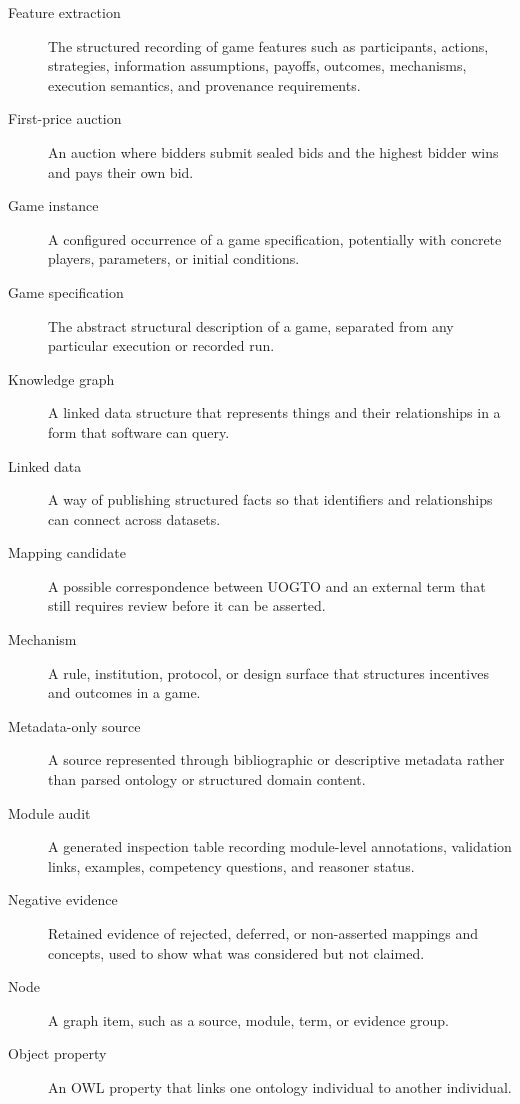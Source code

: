 \documentclass[11pt]{article}
\begin{document}
\begin{description}
\item[\hypertarget{gloss:feature-extraction}{Feature extraction}] The structured recording of game features such as participants, actions, strategies, information assumptions, payoffs, outcomes, mechanisms, execution semantics, and provenance requirements.
\item[\hypertarget{gloss:first-price-auction}{First-price auction}] An auction where bidders submit sealed bids and the highest bidder wins and pays their own bid.
\item[\hypertarget{gloss:game-instance}{Game instance}] A configured occurrence of a game specification, potentially with concrete players, parameters, or initial conditions.
\item[\hypertarget{gloss:game-specification}{Game specification}] The abstract structural description of a game, separated from any particular execution or recorded run.
\item[\hypertarget{gloss:knowledge-graph}{Knowledge graph}] A linked data structure that represents things and their relationships in a form that software can query.
\item[\hypertarget{gloss:linked-data}{Linked data}] A way of publishing structured facts so that identifiers and relationships can connect across datasets.
\item[\hypertarget{gloss:mapping-candidate}{Mapping candidate}] A possible correspondence between UOGTO and an external term that still requires review before it can be asserted.
\item[\hypertarget{gloss:mechanism}{Mechanism}] A rule, institution, protocol, or design surface that structures incentives and outcomes in a game.
\item[\hypertarget{gloss:metadata-only-source}{Metadata-only source}] A source represented through bibliographic or descriptive metadata rather than parsed ontology or structured domain content.
\item[\hypertarget{gloss:module-audit}{Module audit}] A generated inspection table recording module-level annotations, validation links, examples, competency questions, and reasoner status.
\item[\hypertarget{gloss:negative-evidence}{Negative evidence}] Retained evidence of rejected, deferred, or non-asserted mappings and concepts, used to show what was considered but not claimed.
\item[\hypertarget{gloss:node}{Node}] A graph item, such as a source, module, term, or evidence group.
\item[\hypertarget{gloss:object-property}{Object property}] An OWL property that links one ontology individual to another individual.

\end{description}
\end{document}
